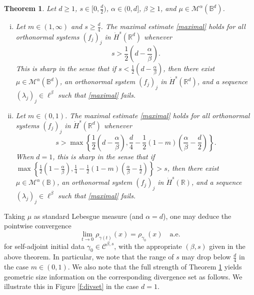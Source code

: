 \documentclass[a4paper]{amsart}
\numberwithin{equation}{section}%
\theoremstyle{plain}%
\newtheorem{theorem}{Theorem}[section]
\theoremstyle{definition}
\theoremstyle{remark}%
\def\ae{\mathrm{a.e.}}
\def\C{\mathcal{C}}
\def\C{\mathcal{C}}
\begin{document}
\begin{theorem}\label{t:maximal main}
    Let $d\geq1$, $s \in [0,\frac{d}{2})$, $\alpha \in (0,d]$, $\beta \geq 1$, and $\mu\in \mathcal M^\alpha(\mathbb B^d)$.
    \begin{enumerate}[(i)]
        \item
        \label{item:t:maximal m larger 1}Let $m\in(1,\infty)$ and $s \geq \frac{d}{4}$. The maximal estimate \eqref{maximal} holds for all orthonormal systems $(f_j)_j$ in $\dot{H}^s({\mathbb R}^d)$ whenever 
        \[
        s > 
        \frac12\left(d-\frac{\alpha}{\beta}\right).
        \]
        This is sharp in the sense that if $s < \frac12(d-\frac{\alpha}{\beta})$, then there exist $\mu\in \mathcal M^\alpha(\mathbb{B}^d)$, an orthonormal system $(f_j)_j$ in $\dot{H}^s({\mathbb R}^d)$, and a sequence $(\lambda_j)_j \in \ell^\beta$ such that \eqref{maximal} fails.
        \item
        \label{item:t:maximal m less 1} Let $m\in (0,1)$. The maximal estimate
        \eqref{maximal} 
        holds for all orthonormal systems $(f_j)_j$ in $\dot{H}^{s}({\mathbb R}^d)$ whenever 
        \[
        s > \max\left\{
        \frac12\left(d-\frac{\alpha}{\beta}\right),
        \frac d4-\frac12(1-m)\left(\frac\alpha\beta-\frac d2\right) 
        \right\}.
        \]
        When $d=1$, this is sharp in the sense that if
        $\max\left\{\frac12(1-\frac{\alpha}{\beta}), \frac14-\frac12(1-m)(\frac\alpha\beta-\frac12)\right\}>s$, then there exist $\mu\in \mathcal M^\alpha(\mathbb{B})$, an orthonormal system $(f_j)_j$ in $\dot{H}^s({\mathbb R})$, and a sequence $(\lambda_j)_j\in \ell^\beta$  such that \eqref{maximal} fails.
    \end{enumerate}
\end{theorem}
Taking $\mu$ as standard Lebesgue measure (and $\alpha = d$), one may deduce the pointwise convergence
\[
\lim_{t\to0} \rho_{\gamma(t)}(x)
=
\rho_{\gamma_0}(x)\quad \ae
\]
for self-adjoint initial data $\gamma_0\in \C^{\beta,s}$, with the appropriate $(\beta,s)$ given in the above theorem. In particular, we note that the range of $s$ may drop below $\frac{d}{4}$ in the case $m \in (0,1)$. We also note that the full strength of Theorem \ref{t:maximal main} yields geometric size information on the corresponding divergence set as follows. We illustrate this in Figure \ref{f:divset} in the case $d = 1$.
\end{document}
